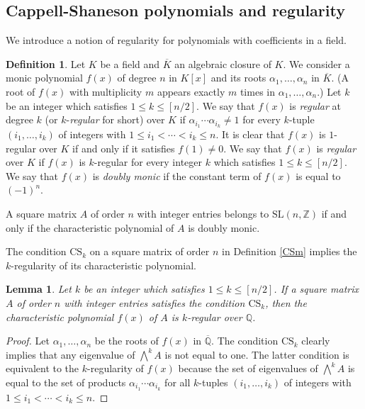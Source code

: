 \documentclass{amsart}
\theoremstyle{plain}
\newtheorem{lem}[thm]{Lemma}
\theoremstyle{definition}
\newtheorem{defn}[thm]{Definition}
\theoremstyle{remark}
\newcommand{\cb}{}
\begin{document}
\subsection{Cappell-Shaneson polynomials and regularity}

We introduce a notion of regularity for polynomials with coefficients in a field. 

\begin{defn}
Let $K$ be a field and $\overline{K}$ an algebraic closure of $K$. 
We consider a monic polynomial $f(x)$ of degree $n$ in $K[x]$ and 
its roots $\alpha_1,\ldots ,\alpha_n$ in $\overline{K}$. 
(A root of $f(x)$ with multiplicity $m$ appears exactly $m$ times in $\alpha_1,\ldots ,\alpha_n$.) 
Let $k$ be an integer which satisfies $1\leq k\leq [n/2]$. 
We say that $f(x)$ is {\it regular} at degree $k$ (or $k$-{\it regular} for short) over $K$ 
if $\alpha_{i_1}\cdots \alpha_{i_k}\ne 1$ for every $k$-tuple $(i_1,\ldots ,i_k)$ of integers 
with $1\leq i_1<\cdots <i_k\leq n$. 
It is clear that $f(x)$ is $1$-regular over $K$ if and only if it satisfies $f(1)\ne 0$. 
We say that $f(x)$ is {\it regular} over $K$ if $f(x)$ is $k$-regular for every integer $k$ 
which satisfies $1\leq k\leq [n/2]$. 
We say that $f(x)$ is {\it doubly monic} if the constant term of $f(x)$ is equal to $(-1)^n$. 
\end{defn}

A square matrix $A$ of order $n$ with integer entries belongs to $\mathrm{SL}(n,\mathbb{Z})$ 
if and only if the characteristic polynomial of $A$ is doubly monic. 

The condition $\mathrm{CS}_k$ on a square matrix of order $n$ 
in Definition \ref{CSm} implies the $k$-regularity of its characteristic polynomial. 

\begin{lem}\label{CS-regular}
Let $k$ be an integer which satisfies $1\leq k\leq [n/2]$. 
If a square matrix $A$ of order $n$ with integer entries satisfies the condition $\mathrm{CS}_k$, 
then the characteristic polynomial $f(x)$ of $A$ is $k$-regular over $\mathbb{Q}$. 
\end{lem}

\begin{proof}
Let $\alpha_1,\ldots ,\alpha_n$ be the roots of $f(x)$ in $\overline{\mathbb{Q}}$. 
The condition $\mathrm{CS}_k$ clearly implies 
that any eigenvalue of $\bigwedge^kA$ is not equal to one. 
{\cb The latter condition  } is equivalent to the $k$-regularity of $f(x)$
because the set of eigenvalues of $\bigwedge^kA$ is equal to 
the set of products $\alpha_{i_1}\cdots \alpha_{i_k}$ 
for all $k$-tuples $(i_1,\ldots ,i_k)$ of integers with $1\leq i_1<\cdots <i_k\leq n$. 
\end{proof}
\end{document}
